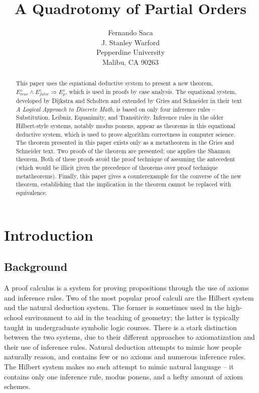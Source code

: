 \documentclass[12pt, fleqn, leqno]{article}
\title{A Quadrotomy of Partial Orders}
\author{
   Fernando Saca\\
   J. Stanley Warford\\
   Pepperdine University\\
   Malibu, CA 90263}
\date{} %
\newcommand{\impl}{\ensuremath{\Rightarrow}}        %
\begin{document}
\maketitle
\begin{abstract}

This paper uses the equational deductive system to present a new theorem, $E^{z}_{true}\land E^{z}_{false} \impl E^{z}_{p}$, which is used in proofs by case analysis. 
The equational system, developed by Dijkstra and Scholten and extended by Gries and Schneider in their text \textit{A Logical Approach to Discrete Math}, is based on only four inference rules -- Substitution, Leibniz, Equanimity, and Transitivity. 
Inference rules in the older Hilbert-style systems, notably modus ponens, appear as theorems in this equational deductive system, which is used to prove algorithm correctness in computer science.
The theorem presented in this paper exists only as a metatheorem in the Gries and Schneider text.
Two proofs of the theorem are presented; one applies the Shannon theorem. 
Both of these proofs avoid the proof technique of assuming the antecedent (which would be illicit given the precedence of theorems over proof technique metatheorems).
Finally, this paper gives a counterexample for the converse of the new theorem, establishing that the implication in the theorem cannot be replaced with equivalence.

\end{abstract}

\thispagestyle{plain}

\section{Introduction}

\subsection{Background}

A proof calculus is a system for proving propositions through the use of axioms and inference rules. Two of the most popular proof calculi are the Hilbert system and the natural deduction system. The former is sometimes used in the high-school environment to aid in the teaching of geometry; the latter is typically taught in undergraduate symbolic logic courses. There is a stark distinction between the two systems, due to their different approaches to axiomatization and their use of inference rules. Natural deduction attempts to mimic how people naturally reason, and contains few or no axioms and numerous inference rules. The Hilbert system makes no such attempt to mimic natural language -- it contains only one inference rule, modus ponens, and a hefty amount of axiom schemes.
\end{document}
